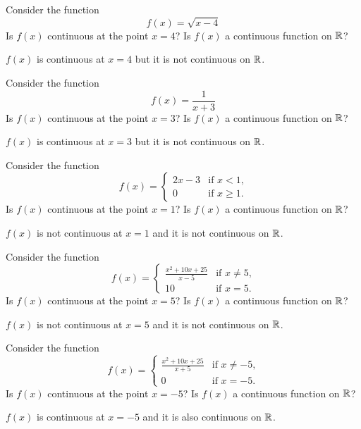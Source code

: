 \begin{exercises}

\begin{exercise} 
Consider the function
\[
f(x) = \sqrt{x-4} 
\]
Is $f(x)$ continuous at the point $x=4$?  Is $f(x)$ a continuous
function on $\mathbb{R}$?
\begin{answer}
  $f(x)$ is continuous at $x=4$ but it is not continuous on $\mathbb{R}$.
\end{answer}
\end{exercise}


\begin{exercise} 
Consider the function
\[
f(x) = \frac{1}{x+3}
\]
Is $f(x)$ continuous at the point $x=3$?  Is $f(x)$ a continuous
function on $\mathbb{R}$?
\begin{answer}
  $f(x)$ is continuous at $x=3$ but it is not continuous on $\mathbb{R}$.
\end{answer}
\end{exercise}

\begin{exercise} 
Consider the function
\[
f(x) = 
\begin{cases} 
2x - 3 & \text{if $x<1$,} \\ 
0      & \text{if $x\geq 1$.}
\end{cases}
\]
Is $f(x)$ continuous at the point $x=1$?  Is $f(x)$ a continuous
function on $\mathbb{R}$?
\begin{answer}
  $f(x)$ is not continuous at $x=1$ and it is not continuous on $\mathbb{R}$.
\end{answer}
\end{exercise}



\begin{exercise} 
Consider the function
\[
f(x) = 
\begin{cases} 
\frac{x^2 + 10x + 25}{x-5} & \text{if $x\ne 5$,} \\ 
10      & \text{if $x= 5$.}
\end{cases}
\]
Is $f(x)$ continuous at the point $x=5$?  Is $f(x)$ a continuous
function on $\mathbb{R}$?
\begin{answer}
  $f(x)$ is not continuous at $x=5$ and it is not continuous on $\mathbb{R}$.
\end{answer}
\end{exercise}


\begin{exercise} 
Consider the function
\[
f(x) = 
\begin{cases} 
\frac{x^2 + 10x + 25}{x+5} & \text{if $x\ne -5$,} \\ 
0      & \text{if $x= -5$.}
\end{cases}
\]
Is $f(x)$ continuous at the point $x=-5$?  Is $f(x)$ a continuous
function on $\mathbb{R}$?
\begin{answer}
  $f(x)$ is continuous at $x=-5$ and it is also continuous on $\mathbb{R}$.
\end{answer}
\end{exercise}




\end{exercises}
